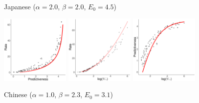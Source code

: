 \documentclass[entropy,article,submit,moreauthors,pdftex,10pt,a4paper]{Definitions/mdpi}
\begin{document}
\begin{figure}
	\begin{center}
		Japanese {\tiny ($\alpha=2.0$, $\beta=2.0$, $E_0=4.5$)}


\includegraphics[width=0.3\textwidth]{code/figures/LDC95T8-words-info-fitted.pdf}
\includegraphics[width=0.3\textwidth]{code/figures/LDC95T8-words-nlogbeta-mem-fitted.pdf}
\includegraphics[width=0.3\textwidth]{code/figures/LDC95T8-words-nlogbeta-ee-fitted.pdf}

		Chinese {\tiny ($\alpha=1.0$, $\beta=2.3$, $E_0=3.1$)}



\end{center}
\end{figure}
\end{document}
